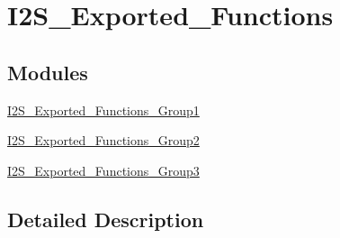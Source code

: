 \hypertarget{group___i2_s___exported___functions}{}\section{I2\+S\+\_\+\+Exported\+\_\+\+Functions}
\label{group___i2_s___exported___functions}
\subsection*{Modules}
\begin{DoxyCompactItemize}
\item 
\hyperlink{group___i2_s___exported___functions___group1}{I2\+S\+\_\+\+Exported\+\_\+\+Functions\+\_\+\+Group1}
\item 
\hyperlink{group___i2_s___exported___functions___group2}{I2\+S\+\_\+\+Exported\+\_\+\+Functions\+\_\+\+Group2}
\item 
\hyperlink{group___i2_s___exported___functions___group3}{I2\+S\+\_\+\+Exported\+\_\+\+Functions\+\_\+\+Group3}
\end{DoxyCompactItemize}


\subsection{Detailed Description}
